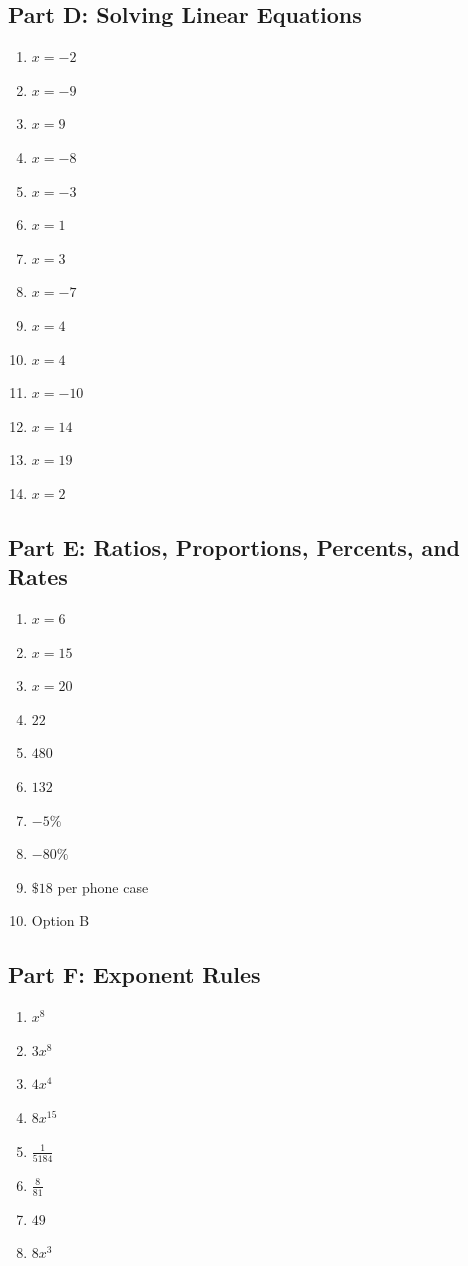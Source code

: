 \documentclass[11pt]{article}
\begin{document}
\subsection*{Part D: Solving Linear Equations}
\begin{multicols}{3}
\begin{enumerate}
  \item $x = -2$
  \item $x = -9$
  \item $x = 9$
  \item $x = -8$
  \item $x = -3$
  \item $x = 1$
  \item $x = 3$
  \item $x = -7$
  \item $x = 4$
  \item $x = 4$
  \item $x = -10$
  \item $x = 14$
  \item $x = 19$
  \item $x = 2$
\end{enumerate}
\end{multicols}
\subsection*{Part E: Ratios, Proportions, Percents, and Rates}
\begin{multicols}{3}
\begin{enumerate}
  \item $x = 6$
  \item $x = 15$
  \item $x = 20$
  \item $22$
  \item $480$
  \item $132$
  \item $-5\%$
  \item $-80\%$
  \item $\$18$ per phone case
  \item Option B
\end{enumerate}
\end{multicols}
\subsection*{Part F: Exponent Rules}
\begin{multicols}{3}
\begin{enumerate}
  \item $x^{8}$
  \item $3 x^{8}$
  \item $4 x^{4}$
  \item $8 x^{15}$
  \item $\frac{1}{5184}$
  \item $\frac{8}{81}$
  \item $49$
  \item $8 x^{3}$
\end{enumerate}
\end{multicols}
\end{document}
